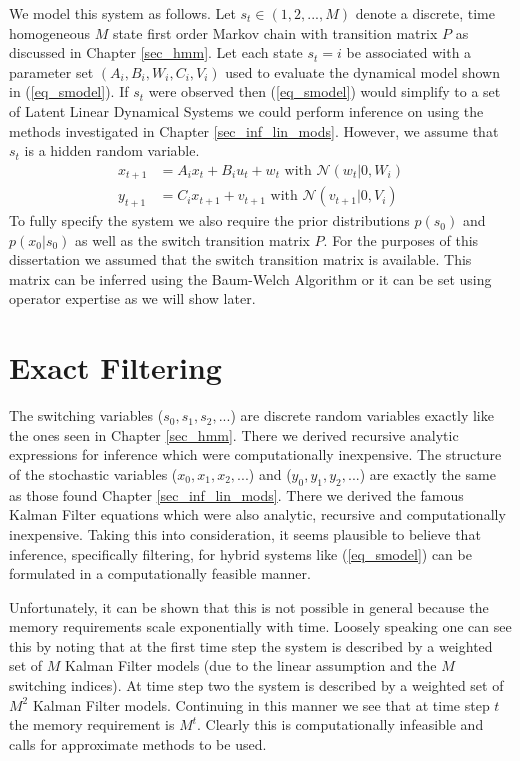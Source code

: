 We model this system as follows. Let $s_t \in (1,2,..., M)$ denote a discrete, time homogeneous $M$ state first order Markov chain with transition matrix $P$ as discussed in Chapter \ref{sec_hmm}. Let each state $s_t=i$ be associated with a parameter set $\left(A_i, B_i, W_i, C_i, V_i \right)$ used to evaluate the dynamical model shown in (\ref{eq_smodel}). If $s_t$ were observed then (\ref{eq_smodel}) would simplify to a set of Latent Linear Dynamical Systems we could perform inference on using the methods investigated in Chapter \ref{sec_inf_lin_mods}. However, we assume that $s_t$ is a hidden random variable.
\begin{equation}
\begin{aligned}
x_{t+1} &= A_ix_t + B_iu_t + w_{t} \text{ with } \mathcal{N}(w_{t}|0,W_i) \\
y_{t+1} &= C_ix_{t+1} + v_{t+1}  \text{ with } \mathcal{N}(v_{t+1}|0,V_i)
\end{aligned}
\label{eq_smodel}
\end{equation}
To fully specify the system we also require the prior distributions $p(s_0)$ and $p(x_0|s_0)$ as well as the switch transition matrix $P$. For the purposes of this dissertation we assumed that the switch transition matrix is available. This matrix can be inferred using the Baum-Welch Algorithm \cite{murphy1} or it can be set using operator expertise as we will show later.

\section{Exact Filtering}
The switching variables ($s_0, s_1, s_2,...$) are discrete random variables exactly like the ones seen in Chapter \ref{sec_hmm}. There we derived recursive analytic expressions for inference which were computationally inexpensive. The structure of the stochastic variables ($x_0, x_1,x_2,...$) and ($y_0,y_1, y_2,...$) are exactly the same as those found Chapter \ref{sec_inf_lin_mods}. There we derived the famous Kalman Filter equations which were also analytic, recursive and computationally inexpensive. Taking this into consideration, it seems plausible to believe that inference, specifically filtering, for hybrid systems like (\ref{eq_smodel}) can be formulated in a computationally feasible manner. 

Unfortunately, it can be shown that this is not possible in general \cite{lerner}\cite{murphy3} because the memory requirements scale exponentially with time. Loosely speaking one can see this by noting that at the first time step the system is described by a weighted set of $M$ Kalman Filter models (due to the linear assumption and the $M$ switching indices). At time step two the system is described by a weighted set of $M^2$ Kalman Filter models. Continuing in this manner we see that at time step $t$ the memory requirement is $M^t$. Clearly this is computationally infeasible and calls for approximate methods to be used. 

